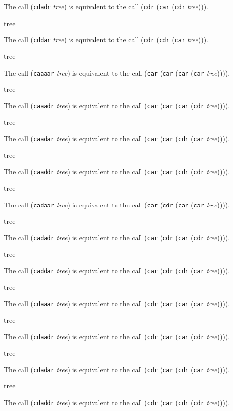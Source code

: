 The call (\texttt{cdadr} \textit{tree}) is equivalent to the call
(\texttt{cdr} (\texttt{car} (\texttt{cdr} \textit{tree}))).


 {tree}

The call (\texttt{cddar} \textit{tree}) is equivalent to the call
(\texttt{cdr} (\texttt{cdr} (\texttt{car} \textit{tree}))).

 {tree}

The call (\texttt{caaaar} \textit{tree}) is equivalent to the call
(\texttt{car} (\texttt{car} (\texttt{car} (\texttt{car}
\textit{tree})))).

 {tree}

The call (\texttt{caaadr} \textit{tree}) is equivalent to the call
(\texttt{car} (\texttt{car} (\texttt{car} (\texttt{cdr}
\textit{tree})))).

 {tree}

The call (\texttt{caadar} \textit{tree}) is equivalent to the call
(\texttt{car} (\texttt{car} (\texttt{cdr} (\texttt{car}
\textit{tree})))).

 {tree}

The call (\texttt{caaddr} \textit{tree}) is equivalent to the call
(\texttt{car} (\texttt{car} (\texttt{cdr} (\texttt{cdr}
\textit{tree})))).

 {tree}

The call (\texttt{cadaar} \textit{tree}) is equivalent to the call
(\texttt{car} (\texttt{cdr} (\texttt{car} (\texttt{car}
\textit{tree})))).

 {tree}

The call (\texttt{cadadr} \textit{tree}) is equivalent to the call
(\texttt{car} (\texttt{cdr} (\texttt{car} (\texttt{cdr}
\textit{tree})))).

 {tree}

The call (\texttt{caddar} \textit{tree}) is equivalent to the call
(\texttt{car} (\texttt{cdr} (\texttt{cdr} (\texttt{car}
\textit{tree})))).

 {tree}

The call (\texttt{cdaaar} \textit{tree}) is equivalent to the call
(\texttt{cdr} (\texttt{car} (\texttt{car} (\texttt{car}
\textit{tree})))).

 {tree}

The call (\texttt{cdaadr} \textit{tree}) is equivalent to the call
(\texttt{cdr} (\texttt{car} (\texttt{car} (\texttt{cdr}
\textit{tree})))).

 {tree}

The call (\texttt{cdadar} \textit{tree}) is equivalent to the call
(\texttt{cdr} (\texttt{car} (\texttt{cdr} (\texttt{car}
\textit{tree})))).

 {tree}

The call (\texttt{cdaddr} \textit{tree}) is equivalent to the call
(\texttt{cdr} (\texttt{car} (\texttt{cdr} (\texttt{cdr}
\textit{tree})))).
